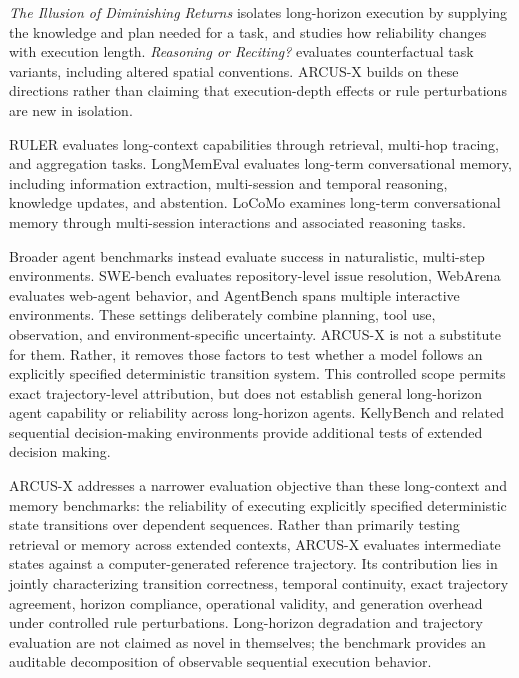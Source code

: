 \documentclass{article}
\begin{document}
\textit{The Illusion of Diminishing Returns} \cite{sinha2026execution} isolates long-horizon execution by supplying the knowledge and plan needed for a task, and studies how reliability changes with execution length. \textit{Reasoning or Reciting?} \cite{wu2024counterfactual} evaluates counterfactual task variants, including altered spatial conventions. ARCUS-X builds on these directions rather than claiming that execution-depth effects or rule perturbations are new in isolation.

RULER \cite{hsieh2024ruler} evaluates long-context capabilities through retrieval, multi-hop tracing, and aggregation tasks. LongMemEval \cite{wu2025longmemeval} evaluates long-term conversational memory, including information extraction, multi-session and temporal reasoning, knowledge updates, and abstention. LoCoMo \cite{maharana2024locomo} examines long-term conversational memory through multi-session interactions and associated reasoning tasks.

Broader agent benchmarks instead evaluate success in naturalistic, multi-step environments. SWE-bench \cite{jimenez2024swebench} evaluates repository-level issue resolution, WebArena \cite{zhou2024webarena} evaluates web-agent behavior, and AgentBench \cite{liu2024agentbench} spans multiple interactive environments. These settings deliberately combine planning, tool use, observation, and environment-specific uncertainty. ARCUS-X is not a substitute for them. Rather, it removes those factors to test whether a model follows an explicitly specified deterministic transition system. This controlled scope permits exact trajectory-level attribution, but does not establish general long-horizon agent capability or reliability across long-horizon agents. KellyBench \cite{grady2026kellybench} and related sequential decision-making environments provide additional tests of extended decision making.

ARCUS-X addresses a narrower evaluation objective than these long-context and memory benchmarks: the reliability of executing explicitly specified deterministic state transitions over dependent sequences. Rather than primarily testing retrieval or memory across extended contexts, ARCUS-X evaluates intermediate states against a computer-generated reference trajectory. Its contribution lies in jointly characterizing transition correctness, temporal continuity, exact trajectory agreement, horizon compliance, operational validity, and generation overhead under controlled rule perturbations. Long-horizon degradation and trajectory evaluation are not claimed as novel in themselves; the benchmark provides an auditable decomposition of observable sequential execution behavior.
\end{document}
